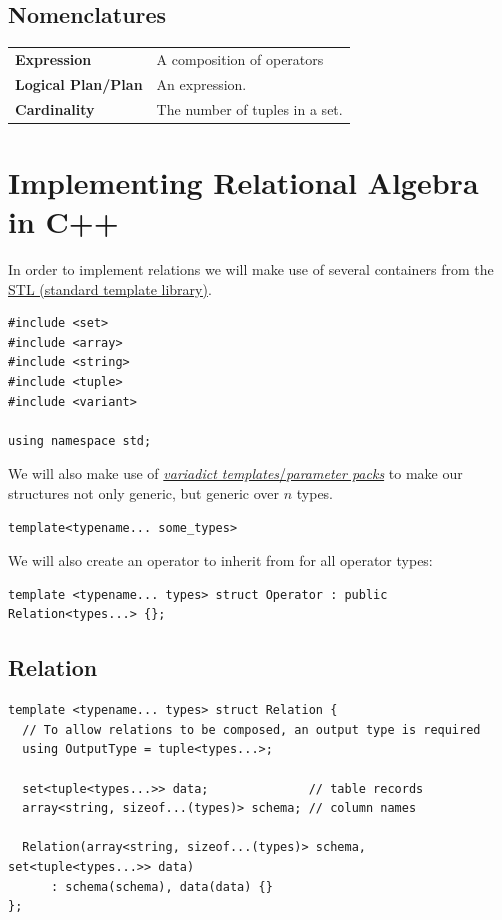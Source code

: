 \subsection{Nomenclatures}
\begin{center}
  \begin{tabular}{l p{}}
    \textbf{Expression} & A composition of operators \\
    \textbf{Logical Plan/Plan} & An expression. \\
    \textbf{Cardinality} & The number of tuples in a set. \\
  \end{tabular}
\end{center}

\section{Implementing Relational Algebra in C++}

In order to implement relations we will make use of several containers from the 
\href{https://en.wikipedia.org/wiki/Standard_Template_Library}{STL (standard template library)}.
\begin{verbatim}
#include <set>
#include <array>
#include <string>
#include <tuple>
#include <variant>

using namespace std;
\end{verbatim}
We will also make use of \href{https://en.cppreference.com/w/cpp/language/parameter_pack}{\textit{variadict templates}/\textit{parameter packs}} to make our structures not only generic, but generic over $n$ types.
\begin{verbatim}
template<typename... some_types>
\end{verbatim}
We will also create an operator to inherit from for all operator types:
\begin{verbatim}
template <typename... types> struct Operator : public Relation<types...> {};
\end{verbatim}

\subsection{Relation}
\begin{verbatim}
template <typename... types> struct Relation {
  // To allow relations to be composed, an output type is required
  using OutputType = tuple<types...>;

  set<tuple<types...>> data;              // table records
  array<string, sizeof...(types)> schema; // column names

  Relation(array<string, sizeof...(types)> schema, set<tuple<types...>> data)
      : schema(schema), data(data) {}
};
\end{verbatim}

